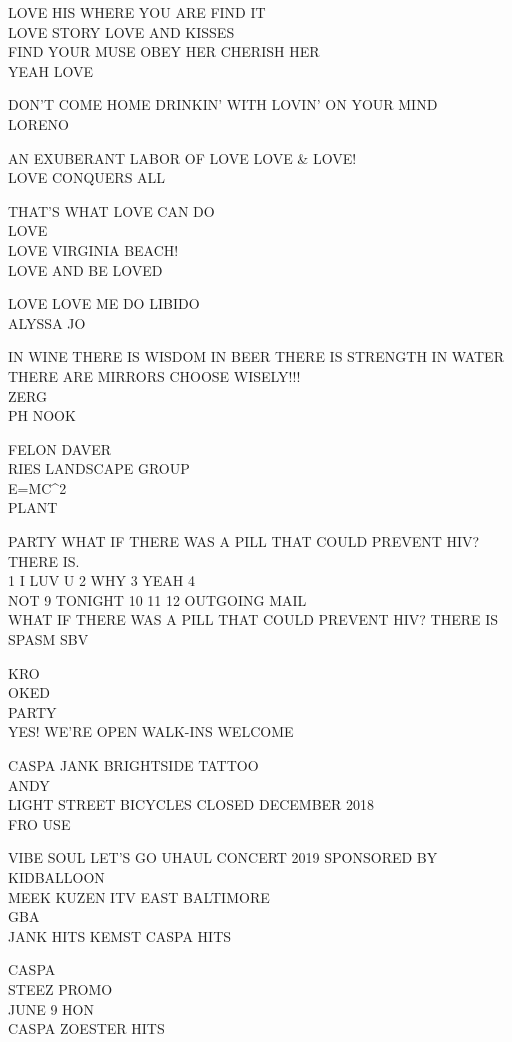 \documentclass[10pt,letterpaper]{article}
\begin{document}
LOVE HIS WHERE YOU ARE FIND IT\\
LOVE STORY LOVE AND KISSES\\
FIND YOUR MUSE OBEY HER CHERISH HER\\
YEAH LOVE

DON'T COME HOME DRINKIN' WITH LOVIN' ON YOUR MIND\\
LORENO

AN EXUBERANT LABOR OF LOVE LOVE \& LOVE!\\
LOVE CONQUERS ALL

THAT'S WHAT LOVE CAN DO\\
LOVE\\
LOVE VIRGINIA BEACH!\\
LOVE AND BE LOVED

LOVE LOVE ME DO LIBIDO\\
ALYSSA JO

IN WINE THERE IS WISDOM IN BEER THERE IS STRENGTH IN WATER THERE ARE MIRRORS CHOOSE WISELY!!!\\
ZERG\\
PH NOOK

FELON DAVER\\
RIES LANDSCAPE GROUP\\
E=MC\^{}2\\
PLANT

PARTY WHAT IF THERE WAS A PILL THAT COULD PREVENT HIV?  THERE IS.\\
1 I LUV U 2 WHY 3 YEAH 4\\
NOT 9 TONIGHT 10 11 12 OUTGOING MAIL\\
WHAT IF THERE WAS A PILL THAT COULD PREVENT HIV?  THERE IS SPASM SBV

KRO\\
OKED\\
PARTY\\
YES!  WE'RE OPEN WALK{-}INS WELCOME

CASPA JANK BRIGHTSIDE TATTOO\\
ANDY\\
LIGHT STREET BICYCLES CLOSED DECEMBER 2018\\
FRO USE

VIBE SOUL LET'S GO UHAUL CONCERT 2019 SPONSORED BY KIDBALLOON\\
MEEK KUZEN ITV EAST BALTIMORE\\
GBA\\
JANK HITS KEMST CASPA HITS

CASPA\\
STEEZ PROMO\\
JUNE 9 HON\\
CASPA ZOESTER HITS
\end{document}
